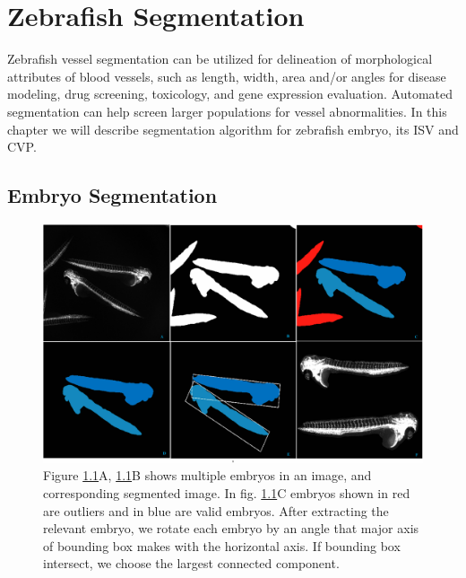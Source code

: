 \chapter{Zebrafish Segmentation}\label{chap:seg}
Zebrafish vessel segmentation can be utilized for delineation of morphological attributes of blood vessels, such as length, width,
area and/or angles for disease modeling, drug screening, toxicology, and gene expression evaluation. Automated segmentation can help screen larger populations for vessel abnormalities. In this chapter we will describe segmentation algorithm for zebrafish embryo, its ISV and CVP.

\section{Embryo Segmentation}
\begin{figure}[htb] 
 \begin{center}
    \includegraphics[scale=0.25]{figure/wholeEmbryo.png}
  \end{center}
  \caption[Zebrafish embryo extraction procedure]{Figure \ref{EmbryoSeg}A, \ref{EmbryoSeg}B shows multiple embryos in an image, and corresponding segmented image. In fig. \ref{EmbryoSeg}C embryos shown in red are outliers and in blue are valid embryos. After extracting the relevant embryo, we rotate each embryo by an angle that major axis of bounding box makes with the horizontal axis. If bounding box intersect, we choose the largest connected component.}
 \label{EmbryoSeg}
\end{figure}

